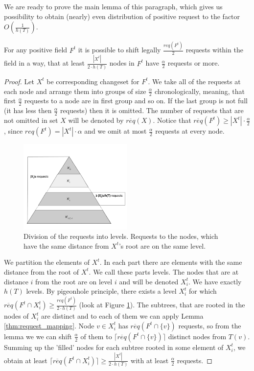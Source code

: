We are ready to prove the main lemma of this
paragraph, which gives us possibility to obtain (nearly) even distribution of
positive request to the factor $O(\frac{1}{h(T)})$. 
\begin{lemma} For any positive field $F^t$ it is possible to shift legally $\frac{req(F^t)}{2}$
requests within the field in a way, that at least $\frac{|X^t|}{2 \cdot h(T)}$ nodes in
$F^t$ have $\frac{\alpha}{2}$ requests or more.
\label{thm:legal_shifting_down}
\end{lemma}
\begin{proof}
Let $X^t$ be corresponding changeset for $F^t$. We
take all of the requests at each node and arrange them into groups of size
$\frac{\alpha}{2}$ chronologically, meaning, that first $\frac{\alpha}{2}$
requests to a node are in first group and so on. If the last group is not full
(it has less then  $\frac{\alpha}{2}$ requests) then it is omitted. The number
of requests that are not omitted in set $X$ will be denoted by
$\overline{req}(X)$. Notice that  $\overline{req}(F^t) \geq |X^t| \cdot
\frac{\alpha}{2}$, since $req(F^t) = |X^t| \cdot \alpha$ and we omit at most
$\frac{\alpha}{2}$ requests at every node.  \begin{figure} \begin{center}
\includegraphics[width=0.5\textwidth]{layers.png} \end{center} \caption{Division
of the requests into levels. Requests to the nodes, which have the same distance
from $X^t$'s root are on the same level.} \label{fig:layers} \end{figure}

We partition the elements of $X^t$. In each part there are elements with the
same distance from the root of $X^t$. We call these parts levels. The nodes that
are at distance $i$ from the root are on level $i$ and will be denoted $X^t_i$.
We have exactly $h(T)$ levels. By pigeonhole principle, there exists a level
$X^t_i$ for which $\overline{req}(F^t \cap X^t_i) \geq \frac{req(F^t)}{2 \cdot
h(T)}$ (look at Figure \ref{fig:layers}). The subtrees, that are rooted in the nodes
of $X^t_i$ are distinct and to each of them we can apply Lemma
\ref{thm:request_mapping}. Node $v \in X^t_i$ has $\overline{req}(F^t \cap
\{v\})$ requests, so from the lemma we we can shift $\frac{\alpha}{2}$ of them
to $\lceil \overline{req}(F^t \cap \{v\}) \rceil$ distinct nodes from $T(v)$.
Summing up the 'filled' nodes for each subtree rooted in some element of
$X^t_i$, we obtain at least $\lceil \overline{req}(F^t \cap X^t_i) \rceil \geq
\frac{|X^t|}{2 \cdot h(T)}$ with at least $\frac{\alpha}{2}$ requests.
\end{proof} 

